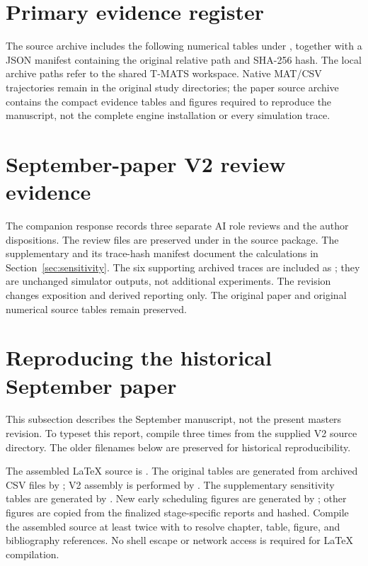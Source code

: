 \section{Primary evidence register}
The source archive includes the following numerical tables under , together with a JSON manifest containing the original relative path and SHA-256 hash. The local archive paths refer to the shared T-MATS workspace. Native MAT/CSV trajectories remain in the original study directories; the paper source archive contains the compact evidence tables and figures required to reproduce the manuscript, not the complete engine installation or every simulation trace.


\section{September-paper V2 review evidence}
The companion response records three separate AI role reviews and the author dispositions. The review files are preserved under  in the source package. The supplementary  and its trace-hash manifest document the calculations in Section~\ref{sec:sensitivity}. The six supporting archived traces are included as ; they are unchanged simulator outputs, not additional experiments. The revision changes exposition and derived reporting only. The original paper and original numerical source tables remain preserved.

\section{Reproducing the historical September paper}
This subsection describes the September manuscript, not the present master\textquotesingle s revision. To typeset this report, compile  three times from the supplied V2 source directory. The older filenames below are preserved for historical reproducibility.

The assembled LaTeX source is . The original tables are generated from archived CSV files by ; V2 assembly is performed by . The supplementary sensitivity tables are generated by . New early scheduling figures are generated by ; other figures are copied from the finalized stage-specific reports and hashed. Compile the assembled source at least twice with  to resolve chapter, table, figure, and bibliography references. No shell escape or network access is required for LaTeX compilation.


